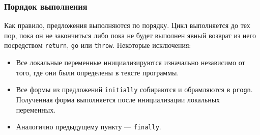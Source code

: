 \subsubsection{Порядок выполнения}
Как правило, предложения выполняются по порядку. Цикл выполняется до тех пор, пока он не закончиться либо пока не будет выполнен явный возврат из него посредством \lstinline{return}, \lstinline{go} или \lstinline{throw}. Некоторые исключения:
\begin{itemize}
  \item Все локальные переменные инициализируются изначально независимо от того, где они были определены в тексте программы.
  \item Все формы из предложений \lstinline{initially} собираются и обрамляются в \lstinline{progn}. Полученная форма выполняется после инициализации локальных переменных.
  \item Аналогично предыдущему пункту — \lstinline{finally}.
\end{itemize}

